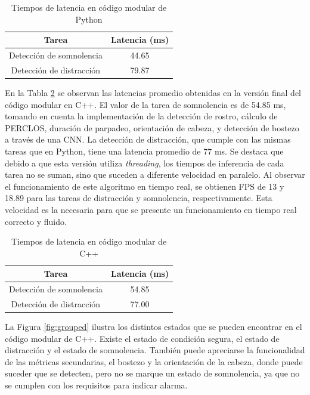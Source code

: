 \begin{table}[h!]
    \centering
    \footnotesize
    \begin{tabular}{c c}
        Tarea & Latencia (ms) \\
        \hline
        Detección de somnolencia & 44.65 \\
        Detección de distracción & 79.87 \\ 
        \hline
    \end{tabular}
    \caption{Tiempos de latencia en código modular de Python}
    \label{tab:Python}
\end{table}

En la Tabla \ref{tab:C} se observan las latencias promedio obtenidas en la versión final del código modular en C++. El valor de la tarea de somnolencia es de 54.85 ms, tomando en cuenta la implementación de la detección de rostro, cálculo de PERCLOS, duración de parpadeo, orientación de cabeza, y detección de bostezo a través de una CNN. La detección de distracción, que cumple con las mismas tareas que en Python, tiene una latencia promedio de 77 ms. Se destaca que debido a que esta versión utiliza \textit{threading}, los tiempos de inferencia de cada tarea no se suman, sino que suceden a diferente velocidad en paralelo. Al observar el funcionamiento de este algoritmo en tiempo real, se obtienen FPS de 13 y 18.89 para las tareas de distracción y somnolencia, respectivamente. Esta velocidad es la necesaria para que se presente un funcionamiento en tiempo real correcto y fluido.
\begin{table}[h!]
    \centering
    \footnotesize
    \renewcommand{\arraystretch}{1.8} 
    \begin{tabular}{c c}
        Tarea & Latencia (ms) \\
        \hline
        Detección de somnolencia & 54.85 \\
        Detección de distracción & 77.00 \\ 
        \hline
    \end{tabular}
    \caption{Tiempos de latencia en código modular de C++}
    \label{tab:C}
\end{table}

La Figura \ref{fig:grouped} ilustra los distintos estados que se pueden encontrar en el código modular de C++. Existe el estado de condición segura, el estado de distracción y el estado de somnolencia. También puede apreciarse la funcionalidad de las métricas secundarias, el bostezo y la orientación de la cabeza, donde puede suceder que se detecten, pero no se marque un estado de somnolencia, ya que no se cumplen con los requisitos para indicar alarma.  

